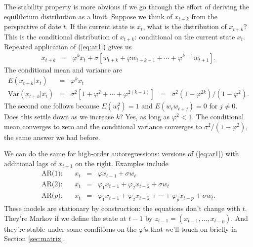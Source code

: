 \documentclass[11pt]{article}
\begin{document}
The stability property is more obvious if we go through the effort
of deriving the equilibrium distribution as a limit.
Suppose we think of $x_{t+k}$ from the perspective of date $t$.
If the current state is $x_{t}$, what is the distribution of $x_{t+k}$?
This is the conditional distribution of $x_{t+k}$:  conditional
on the current state $x_t$.
Repeated application of (\ref{eq:ar1}) gives us
\begin{eqnarray*}
    x_{t+k} &=& \varphi^k x_{t} +
            \sigma \left[ w_{t+k} + \varphi w_{t+k-1} +
                    \cdots + \varphi^{k-1} w_{t+1} \right].
\end{eqnarray*}
The conditional mean and variance are
\begin{eqnarray*}
    E (x_{t+k} | x_t ) &=& \varphi^k x_{t} \\
    \mbox{Var}(x_{t+k} | x_t )
            &=&  \sigma^2 \left[ 1 + \varphi^2 + \cdots + \varphi^{2(k-1)} \right]
                \;\;=\;\; \sigma ^2 (1-\varphi^{2k})/(1-\varphi^2) .
\end{eqnarray*}
The second one follows because $E(w_t^2) = 1$
and $E (w_t w_{t+j}) = 0$ for $ j\neq 0$.
Does this settle down as we increase $k$?
Yes, as long as $\varphi^2 < 1$.
The conditional mean converges to zero and
the conditional variance converges to $\sigma^2/(1-\varphi^2)$,
the same answer we had before.

\begin{comment}
???

*** Law of iterated expecations... \\
\url{http://en.wikipedia.org/wiki/Law_of_total_expectation}

*** Var is var of cond mean plus forecast error \\
\url{http://en.wikipedia.org/wiki/Law_of_total_variance}

*** Multistep forecasting...
\end{comment}

We can do the same for high-order autoregressions:
versions of (\ref{eq:ar1}) with additional lags of $x_{t+1}$ on the right.
Examples include
\begin{eqnarray*}
    \mbox{AR(1)}:     &&  x_t \;\;=\;\; \varphi x_{t-1} + \sigma w_t  \\
    \mbox{AR($2$)}:   &&  x_t \;\;=\;\; \varphi_1 x_{t-1} + \varphi_2 x_{t-2}
                    +\sigma w_t  \\
    \mbox{AR($p$)}:   &&  x_t \;\;=\;\; \varphi_1 x_{t-1} + \varphi_2 x_{t-2}
                    + \cdots + \varphi_p x_{t-p} + \sigma w_t   .
\end{eqnarray*}
These models are stationary by construction:  the equations don't change with $t$.
They're Markov if we define the state at $t-1$ by
$ z_{t-1} = (x_{t-1}, \ldots, x_{t-p})$.
And they're stable under some conditions on the $\varphi$'s that we'll
touch on briefly in Section \ref{sec:matrix}.
\end{document}
